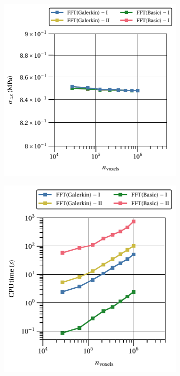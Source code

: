 \begin{figure}[hbt]
\centering
	\begin{subfigure}[b]{0.52\textwidth}
    \centering
    \includegraphics[width=\textwidth]{figures/linear_3D_normal_comparison_crit_homo_stress_11_vs_n_voxels}
    \caption{}
    \label{subfig:linear_3D_normal_comparison_crit_homo_stress_11_vs_n_voxels}
  \end{subfigure}
  \begin{subfigure}[b]{0.46\textwidth}
    \centering
    \includegraphics[width=\textwidth]{figures/linear_3D_normal_comparison_crit_cpu_time_vs_n_voxels}

\end{subfigure}
\end{figure}
